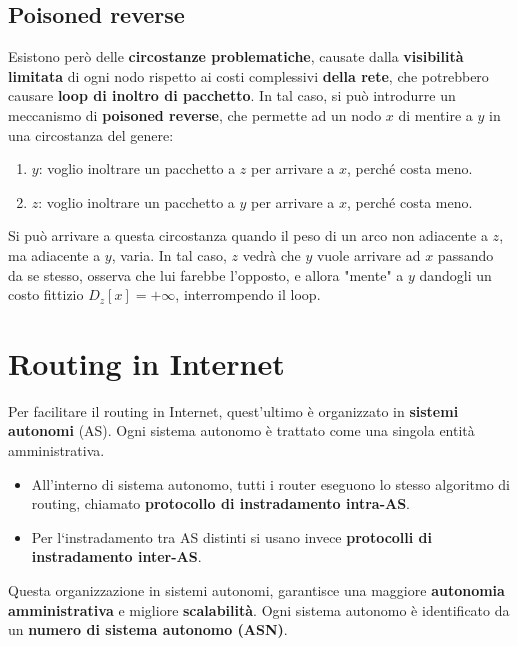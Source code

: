 \subsection{Poisoned reverse}
Esistono però delle \textbf{circostanze problematiche}, causate dalla \textbf{visibilità limitata} di ogni nodo rispetto ai costi complessivi \textbf{della rete}, che potrebbero causare \textbf{loop di inoltro di pacchetto}. In tal caso, si può introdurre un meccanismo di \textbf{poisoned reverse}, che permette ad un nodo $x$ di mentire a $y$ in una circostanza del genere:
\begin{enumerate}
	\item $y$: voglio inoltrare un pacchetto a $z$ per arrivare a $x$, perché costa meno.
	\item $z$: voglio inoltrare un pacchetto a $y$ per arrivare a $x$, perché costa meno.
\end{enumerate}
Si può arrivare a questa circostanza quando il peso di un arco non adiacente a $z$, ma adiacente a $y$, varia. In tal caso, $z$ vedrà che $y$ vuole arrivare ad $x$ passando da se stesso, osserva che lui farebbe l'opposto, e allora "mente" a $y$ dandogli un costo fittizio $D_z[x]=+\infty$, interrompendo il loop.

\newpage

\section{Routing in Internet}
Per facilitare il routing in Internet, quest'ultimo è organizzato in \textbf{sistemi autonomi} (AS). Ogni sistema autonomo è trattato come una singola entità amministrativa. 
\begin{itemize}
	\item All'interno di sistema autonomo, tutti i router eseguono lo stesso algoritmo di routing, chiamato \textbf{protocollo di instradamento intra-AS}.
	\item Per l‘instradamento tra AS distinti si usano invece \textbf{protocolli di instradamento inter-AS}.
\end{itemize} 
Questa organizzazione in sistemi autonomi, garantisce una maggiore \textbf{autonomia amministrativa} e migliore \textbf{scalabilità}. Ogni sistema autonomo è identificato da un \textbf{numero di sistema autonomo (ASN)}.

